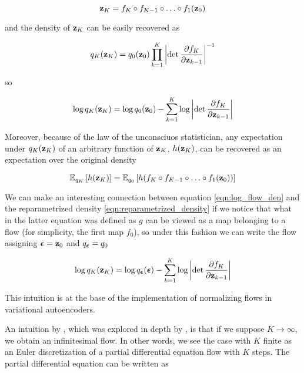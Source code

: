 \documentclass[12pt]{article}
\begin{document}
\begin{equation}
    \textbf{z}_K = f_K \circ f_{K-1} \circ \ldots \circ f_1(\textbf{z}_0)
\end{equation}

and the density of \(\textbf{z}_K\) can be easily recovered as

\begin{equation}
    q_K(\textbf{z}_K) = q_0(\textbf{z}_0)\prod_{k=1}^K\left| \det \frac{\partial f_K}{\partial \textbf{z}_{k-1}}\right|^{-1}
\end{equation}

so

\begin{equation}
    \label{eqn:log_flow_den}
    \log q_K(\textbf{z}_K) = \log q_0(\textbf{z}_0) - \sum_{k=1}^K \log \left| \det \frac{\partial f_K}{\partial \textbf{z}_{k-1}}\right|
\end{equation}

Moreover, because of the law of the unconsciuos statistician, any expectation under \(q_K(\textbf{z}_K)\) of an arbitrary function of \(\textbf{z}_K\), \(h(\textbf{z}_K)\), can be recovered as an expectation over the original density


\begin{equation}
    \mathbb{E}_{q_K}\left[h(\textbf{z}_K)\right] = \mathbb{E}_{q_0}\left[h(f_K \circ f_{K-1} \circ \ldots \circ f_1(\textbf{z}_0))\right]
\end{equation}

We can make an interesting connection between equation \eqref{eqn:log_flow_den} and the reparametrized density \eqref{eqn:reparametrized_density} if we notice that what in the latter equation was defined as \(g\) can be viewed as a map belonging to a flow (for simplicity, the first map \(f_0\)), so under this fashion we can write the flow assigning \(\bm{\epsilon} = \textbf{z}_0\) and \(q_{\bm{\epsilon}} = q_0\)

\begin{equation}
    \log q_K(\textbf{z}_K) = \log q_{\bm{\epsilon}}(\bm{\epsilon}) - \sum_{k=1}^K \log \left| \det \frac{\partial f_K}{\partial \textbf{z}_{k-1}}\right|
\end{equation}

This intuition is at the base of the implementation of normalizing flows in variational autoencoders. 


An intuition by \cite{Mohamed2015VariationalIM}, which was explored in depth by \cite{NEURIPS2018_69386f6b}, is that if we suppose \(K \rightarrow \infty\), we obtain an infinitesimal flow. In other words, we see the case with \(K\) finite as an Euler discretization of a partial differential equation flow \cite{NEURIPS2018_69386f6b} with \(K\) steps. The partial differential equation can be written as 
\end{document}
